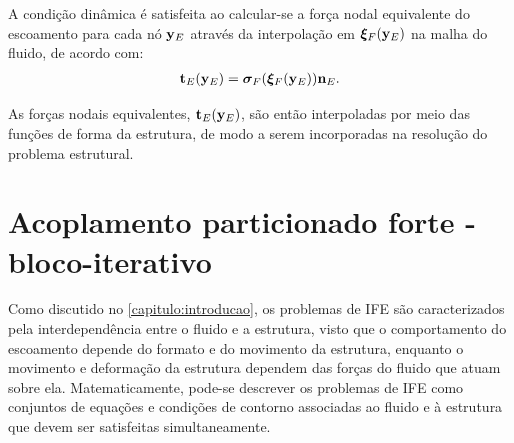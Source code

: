 A condição dinâmica é satisfeita ao calcular-se a força nodal equivalente do escoamento para cada nó $\mathbf{y}_E$ através da interpolação em $\boldsymbol{\xi}_F(\mathbf{y}_E)$ na malha do fluido, de acordo com:
\begin{align}
	\mathbf{t}_{E}(\mathbf{y}_E) =\boldsymbol{\sigma}_{F}(\boldsymbol{\xi}_F(\mathbf{y}_E)) \mathbf{n}_{E}. \label{eq:cond_dina}
\end{align}

As forças nodais equivalentes, $\mathbf{t}_{E}(\mathbf{y}_E)$, são então interpoladas por meio das funções de forma da estrutura, de modo a serem incorporadas na resolução do problema estrutural.

\section{Acoplamento particionado forte - bloco-iterativo}

Como discutido no \autoref{capitulo:introducao}, os problemas de IFE são caracterizados pela interdependência entre o fluido e a estrutura, visto que o comportamento do escoamento depende do formato e do movimento da estrutura, enquanto o movimento e deformação da estrutura dependem das forças do fluido que atuam sobre ela. Matematicamente, pode-se descrever os problemas de IFE como conjuntos de equações e condições de contorno associadas ao fluido e à estrutura que devem ser satisfeitas simultaneamente.

